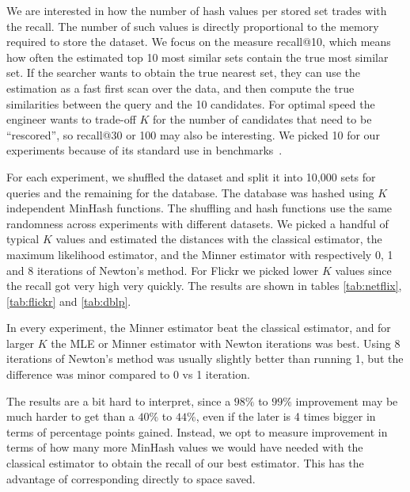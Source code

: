 We are interested in how the number of hash values per stored set trades with the recall.
The number of such values is directly proportional to the memory required to store the dataset.
We focus on the measure recall@10, which means how often the estimated top 10 most similar sets contain the true most similar set.
If the searcher wants to obtain the true nearest set, they can use the estimation as a fast first scan over the data, and then compute the true similarities between the query and the 10 candidates.
For optimal speed the engineer wants to trade-off $K$ for the number of candidates that need to be ``rescored'', so recall@30 or 100 may also be interesting.
We picked 10 for our experiments because of its standard use in benchmarks~\cite{aumuller2017ann}.

For each experiment, we shuffled the dataset and split it into 10,000 sets for queries and the remaining for the database.
The database was hashed using $K$ independent MinHash functions.
The shuffling and hash functions use the same randomness across experiments with different datasets.
We picked a handful of typical $K$ values and estimated the distances with the classical estimator, the maximum likelihood estimator, and the Minner estimator with respectively 0, 1 and 8 iterations of Newton's method.
For Flickr we picked lower $K$ values since the recall got very high very quickly.
The results are shown in tables \ref{tab:netflix}, \ref{tab:flickr} and \ref{tab:dblp}.

In every experiment, the Minner estimator beat the classical estimator, and for larger $K$ the MLE or Minner estimator with Newton iterations was best.
Using 8 iterations of Newton's method was usually slightly better than running 1, but the difference was minor compared to 0 vs 1 iteration.

\smallskip

The results are a bit hard to interpret, since a $98\%$ to $99\%$ improvement may be much harder to get than a $40\%$ to $44\%$, even if the later is 4 times bigger in terms of percentage points gained.
Instead, we opt to measure improvement in terms of how many more MinHash values we would have needed with the classical estimator to obtain the recall of our best estimator.
This has the advantage of corresponding directly to space saved.

